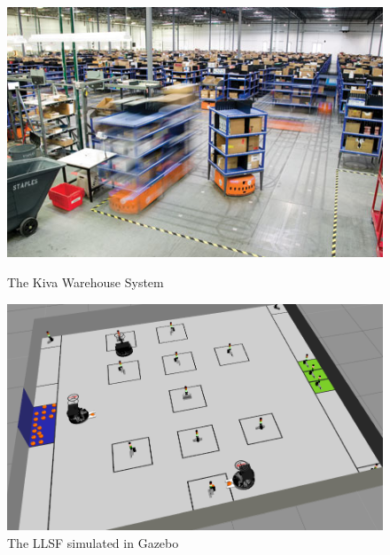 \begin{figure}
\begin{minipage}[b]{0.5\linewidth}
\includegraphics[width=\textwidth,height=0.65\textwidth]{pics/kiva_2}
\caption[The Kiva Warehouse System]{The Kiva Warehouse System~\cite{kiva_amazon}}
\label{fig:kiva}
\end{minipage}
\quad
\begin{minipage}[b]{0.5\linewidth}
\includegraphics[width=\textwidth,height=0.65\textwidth]{pics/sim_working}
\caption{The LLSF simulated in Gazebo}
\label{fig:intro_sim}
\end{minipage}
\end{figure}
